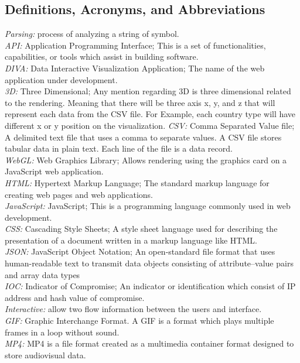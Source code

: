 \documentclass[journal,10pt,onecolumn,compsoc]{IEEEtran} \usepackage[margin=1.0in]{geometry} \usepackage{pdfpages}
\begin{document}
    \subsection{Definitions, Acronyms, and Abbreviations}
    \textit{Parsing: } process of analyzing a string of symbol.\\
    \textit{API: } Application Programming Interface; This is a set of functionalities, capabilities, or tools which assist in building software. \\
    \textit{DIVA: } Data Interactive Visualization Application; The name of the web application under development. \\
    \textit{3D: } Three Dimensional; Any mention regarding 3D is three dimensional related to the rendering. Meaning that there will be three axis x, y, and z that will represent each data from the CSV file. For Example, each country type will have different x or y position on the visualization.
    \textit{CSV: } Comma Separated Value file; A delimited text file that uses a comma to separate values. A CSV file stores tabular data in plain text. Each line of the file is a data record. \\
    \textit{WebGL:} Web Graphics Library; Allows rendering using the graphics card on a JavaScript web application.\\
    \textit{HTML:} Hypertext Markup Language; The standard markup language for creating web pages and web applications. \\
    \textit {JavaScript: }JavaScript; This is a programming language commonly used in web development. \\
    \textit{CSS: }Cascading Style Sheets; A style sheet language used for describing the presentation of a document written in a markup language like HTML. \\
    \textit{JSON: }JavaScript Object Notation; An open-standard file format that uses human-readable text to transmit data objects consisting of attribute–value pairs and array data types\\
    \textit{IOC: }Indicator of Compromise; An indicator or identification which consist of IP address and hash value of compromise.\\
    \textit{Interactive: }allow two flow information between the users and interface.\\
    \textit{GIF: }Graphic Interchange Format. A GIF is a format which plays multiple frames in a loop without sound.\\
    \textit{MP4: }MP4 is a file format created as a multimedia container format designed to store audiovisual data.\\
\end{document}
